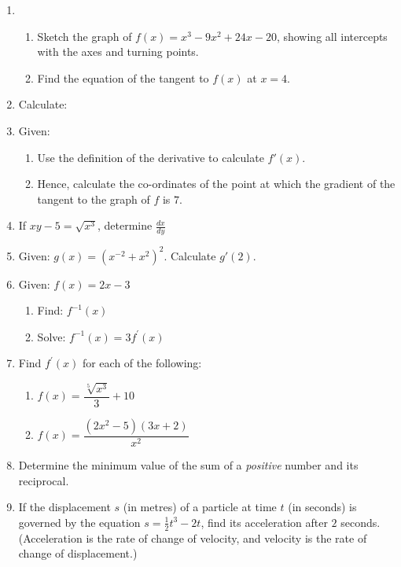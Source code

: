 \begin{eocexercises}{}
\begin{enumerate}
\item{\begin{enumerate}
\item{Sketch the graph of $f(x) = x^3 - 9x^2 + 24x - 20$, showing all intercepts with the axes and turning points.}
\item{Find the equation of the tangent to $f(x)$ at $x=4$.}
\end{enumerate}}

\item{Calculate:
}
\item{Given:
\begin{enumerate}
\item{Use the definition of the derivative to calculate $f'(x)$.}
\item{Hence, calculate the co-ordinates of the point at which the gradient of the tangent to the graph of $f$ is $7$.}
\end{enumerate}
}

\item{If $xy-5=\sqrt{x^3}$, determine $\frac{dx}{dy}$}

\item{Given: $g(x)=(x^{-2}+x^2)^2$.
Calculate $g'(2)$.}


\item{Given: $f(x) = 2x - 3$
\begin{enumerate}
\item{Find: $f^{-1}(x)$}
\item{Solve: $f^{-1}(x) = 3f^{\prime}(x)$}
\end{enumerate}}

\item{Find $f^{\prime}(x)$ for each of the following:
\begin{enumerate}
\item{$f(x) = \dfrac{\sqrt[5]{x^3}}{3} + 10$}
\item{$f(x) = \dfrac{(2x^2 - 5)(3x + 2)}{x^2}$}
\end{enumerate}}

\item{Determine the minimum value of the sum of a \textit{positive} number and its reciprocal.}


\item{If the displacement $s$ (in metres) of a particle at time $t$ (in seconds) is governed by the equation $s=\tfrac{1}{2}t^3 - 2t$, find its acceleration after $2$ seconds. (Acceleration is the rate of change of velocity, and velocity is the rate of change of displacement.)}


\end{enumerate}
\end{eocexercises}
